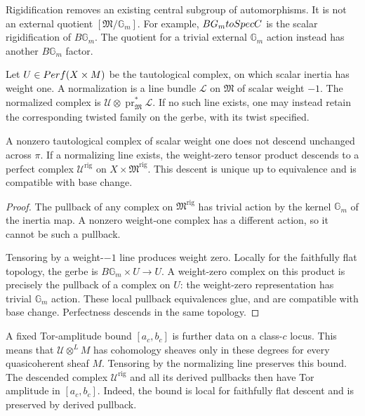 Rigidification removes an existing central subgroup of automorphisms.
It is not an external quotient $[\mathfrak M/\mathbb G_m]$.
For example, $BG_mtoSpecC$ is the scalar
rigidification of $B\mathbb G_m$.  The quotient for a trivial external
$\mathbb G_m$ action instead has another $B\mathbb G_m$ factor.

\begin{definition}
\label{def:retained-universal-perfect-complex-datum}
Let $U\in Perf(X\times M)$ be the tautological
complex, on which scalar inertia has weight one.  A normalization is
a line bundle $\mathcal L$ on $\mathfrak M$ of scalar weight $-1$.
The normalized complex is
$\mathcal U\otimes\operatorname{pr}_{\mathfrak M}^*\mathcal L$.
If no such line exists, one may instead retain the corresponding
twisted family on the gerbe, with its twist specified.
\end{definition}

\begin{proposition}
\label{prop:retained-universal-perfect-complexes}
A nonzero tautological complex of scalar weight one does not descend
unchanged across $\pi$.  If a normalizing line exists, the
weight-zero tensor product descends to a perfect complex
$\mathcal U^{\mathrm{rig}}$ on $X\times\mathfrak M^{\mathrm{rig}}$.
This descent is unique up to equivalence and is compatible with
base change.
\end{proposition}

\begin{proof}
The pullback of any complex on $\mathfrak M^{\mathrm{rig}}$ has
trivial action by the kernel $\mathbb G_m$ of the inertia map.
A nonzero weight-one complex has a different action, so it cannot
be such a pullback.

Tensoring by a weight-$-1$ line produces weight zero.
Locally for the faithfully flat topology, the gerbe is
$B\mathbb G_m\times U\to U$.  A weight-zero complex on this product
is precisely the pullback of a complex on $U$: the weight-zero
representation has trivial $\mathbb G_m$ action.  These local
pullback equivalences glue, and are compatible with base change.
Perfectness descends in the same topology.
\end{proof}

A fixed Tor-amplitude bound $[a_c,b_c]$ is further data on a
class-$c$ locus.  This means that $\mathcal U\otimes^L M$ has
cohomology sheaves only in these degrees for every quasicoherent
sheaf $M$.  Tensoring by the normalizing line preserves this bound.
The descended complex $\mathcal U^{\mathrm{rig}}$ and all its
derived pullbacks then have Tor amplitude in $[a_c,b_c]$.
Indeed, the bound is local for faithfully flat descent and is
preserved by derived pullback.

